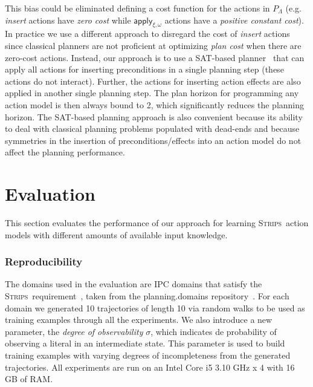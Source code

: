 \documentclass{article}
\newcommand{\strips}{\textsc{Strips}}
\begin{document}
This bias could be eliminated defining a cost function for the actions in $P_\Lambda$ (e.g. {\em insert} actions have {\em zero cost} while $\mathsf{apply_{\xi,\omega}}$ actions have a {\em positive constant cost}). In practice we use a different approach to disregard the cost of {\em insert} actions since classical planners are not proficient at optimizing {\em plan cost} when there are zero-cost actions. Instead, our approach is to use a SAT-based planner~\cite{rintanen2014madagascar} that can apply all actions for inserting preconditions in a single planning step (these actions do not interact). Further, the actions for inserting action effects are also applied in another single planning step. The plan horizon for programming any action model is then always bound to 2, which significantly reduces the planning horizon. The SAT-based planning approach is also convenient because its ability to deal with classical planning problems populated with dead-ends and because symmetries in the insertion of preconditions/effects into an action model do not affect the planning performance.



\section{Evaluation}
\label{sec:evaluation}
This section evaluates the performance of our approach for learning \strips\ action models with different amounts of available input knowledge.

\subsubsection{Reproducibility}
The domains used in the evaluation are IPC domains that satisfy the \strips\ requirement~\cite{fox2003pddl2}, taken from the {\sc planning.domains} repository~\cite{muise2016planning}. For each domain we generated 10 trajectories of length 10 via random walks to be used as training examples through all the experiments. We also introduce a new parameter, the {\em degree of observability} $\sigma$, which indicates de probability of observing a literal in an intermediate state. This parameter is used to build training examples with varying degrees of incompleteness from the generated trajectories. All experiments are run on an Intel Core i5 3.10 GHz x 4 with 16 GB of RAM.

\end{document}
